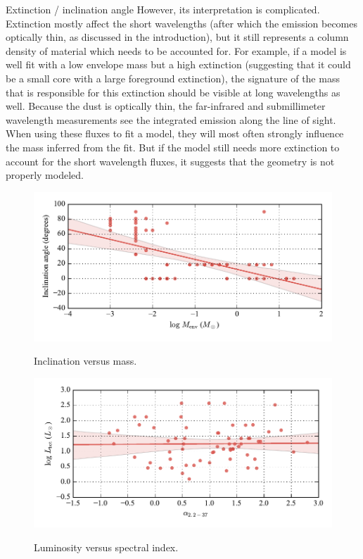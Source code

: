 Extinction / inclination angle However, its interpretation is complicated. Extinction mostly affect the short wavelengths (after which the emission becomes optically thin, as discussed in the introduction), but it still represents a column density of material which needs to be accounted for. For example, if a model is well fit with a low envelope mass but a high extinction (suggesting that it could be a small core with a large foreground extinction), the signature of the mass that is responsible for this extinction should be visible at long wavelengths as well. Because the dust is optically thin, the far-infrared and submillimeter wavelength measurements see the integrated emission along the line of sight. When using these fluxes to fit a model, they will most often strongly influence the mass inferred from the fit. But if the model still needs more extinction to account for the short wavelength fluxes, it suggests that the geometry is not properly modeled. 



\begin{figure}[!h]
\begin{center}
\includegraphics[width=\textwidth]{Figures/incVSmass.pdf}
\label{fig:incVSmass}
\vspace{-1cm}
\caption[Inclination versus mass]{Inclination versus mass.}
\end{center}
\end{figure}




\begin{figure}[!h]
\begin{center}
\includegraphics[width=\textwidth]{Figures/slumVSalpha.pdf}
\label{fig:slumVSalpha}
\vspace{-1cm}
\caption[Luminosity versus spectral index.]{Luminosity versus spectral index.}
\end{center}
\end{figure}



